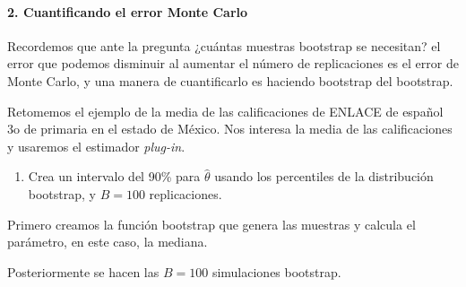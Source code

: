 \documentclass[]{article}
\newenvironment{Shaded}{\begin{snugshade}}{\end{snugshade}}
\newcommand{\ControlFlowTok}[1]{\textcolor[rgb]{0.13,0.29,0.53}{\textbf{#1}}}
\newcommand{\DataTypeTok}[1]{\textcolor[rgb]{0.13,0.29,0.53}{#1}}
\newcommand{\DecValTok}[1]{\textcolor[rgb]{0.00,0.00,0.81}{#1}}
\newcommand{\KeywordTok}[1]{\textcolor[rgb]{0.13,0.29,0.53}{\textbf{#1}}}
\newcommand{\NormalTok}[1]{#1}
\newcommand{\OperatorTok}[1]{\textcolor[rgb]{0.81,0.36,0.00}{\textbf{#1}}}
\newcommand{\OtherTok}[1]{\textcolor[rgb]{0.56,0.35,0.01}{#1}}
\newcommand{\StringTok}[1]{\textcolor[rgb]{0.31,0.60,0.02}{#1}}
\providecommand{\tightlist}{%
  \setlength{\itemsep}{0pt}\setlength{\parskip}{0pt}}
\let\oldparagraph\paragraph
\renewcommand{\paragraph}[1]{\oldparagraph{#1}\mbox{}}
\begin{document}
\hypertarget{cuantificando-el-error-monte-carlo}{%
\paragraph{2. Cuantificando el error Monte
Carlo}\label{cuantificando-el-error-monte-carlo}}

Recordemos que ante la pregunta ¿cuántas muestras bootstrap se
necesitan? el error que podemos disminuir al aumentar el número de
replicaciones es el error de Monte Carlo, y una manera de cuantificarlo
es haciendo bootstrap del bootstrap.

Retomemos el ejemplo de la media de las calificaciones de ENLACE de
español 3o de primaria en el estado de México. Nos interesa la media de
las calificaciones y usaremos el estimador \emph{plug-in}.

\begin{enumerate}
\def\labelenumi{\arabic{enumi}.}
\tightlist
\item
  Crea un intervalo del 90\% para \(\hat{\theta}\) usando los
  percentiles de la distribución bootstrap, y \(B=100\) replicaciones.
\end{enumerate}

Primero creamos la función bootstrap que genera las muestras y calcula
el parámetro, en este caso, la mediana.

\begin{Shaded}
\end{Shaded}

Posteriormente se hacen las \(B=100\) simulaciones bootstrap.

\begin{Shaded}
\end{Shaded}
\end{document}
